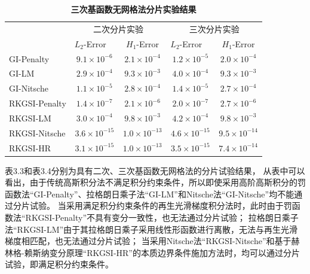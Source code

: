 \begin{table}[H]
\caption{\textbf{三次基函数无网格法分片实验结果}}
\centering
\begin{tabular}{lcccc}
   \toprule
& \multicolumn{2}{c}{二次分片实验} & \multicolumn{2}{c}{三次分片实验} \\ \cline{2-5}
   &$L_2$-Error$\quad$&$H_1$-Error&$L_2$-Error$\quad$&$H_1$-Error\\
   \midrule
   GI-Penalty&$9.1\times10^{-6}$&$2.1\times10^{-4}$&$1.2\times10^{-5}$&$2.0\times10^{-4}$\\
   GI-LM&$2.9\times10^{-4}$&$9.3\times10^{-3}$&$4.0\times10^{-4}$&$9.3\times10^{-3}$\\
   GI-Nitsche&$1.1\times10^{-5}$&$2.8\times10^{-4}$&$1.4\times10^{-5}$&$2.7\times10^{-4}$\\
  RKGSI-Penalty&$1.4\times10^{-7}$&$2.1\times10^{-6}$&$2.0\times10^{-7}$&$2.7\times10^{-6}$\\
  RKGSI-LM&$3.0\times10^{-4}$&$9.8\times10^{-3}$&$4.2\times10^{-4}$&$9.8\times10^{-3}$\\
  RKGSI-Nitsche&$3.6\times10^{-15}$&$1.0\times10^{-13}$&$4.6\times10^{-15}$&$9.5\times10^{-14}$\\
  RKGSI-HR&$3.1\times10^{-15}$&$1.0\times10^{-13}$&$3.5\times10^{-15}$&$7.4\times10^{-14}$\\
   \bottomrule
\end{tabular}
\end{table}
表3.3和表3.4分别为具有二次、三次基函数无网格法的分片试验结果，
从表中可以看出，由于传统高斯积分法不满足积分约束条件，所以即使采用高阶高斯积分的罚函数法“GI-Penalty”、拉格朗日乘子法“GI-LM”和Nitsche法“GI-Nitsche”均不能通过分片试验。
当采用满足积分约束条件的再生光滑梯度积分法时，此时由于罚函数法“RKGSI-Penalty”不具有变分一致性，也无法通过分片试验；
拉格朗日乘子法“RKGSI-LM”由于其拉格朗日乘子采用线性形函数进行离散，无法与再生光滑梯度相匹配，也无法通过分片试验；
当采用Nitsche法“RKGSI-Nitsche”和基于赫林格-赖斯纳变分原理“RKGSI-HR”的本质边界条件施加方法时，均可以通过分片试验，即满足积分约束条件。

